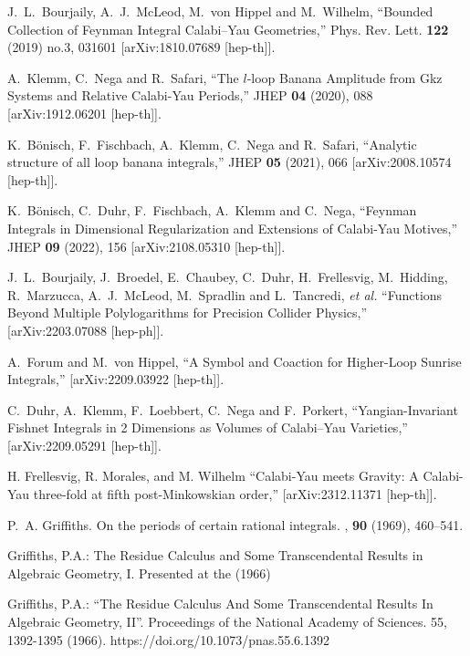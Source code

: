 \documentclass[a4paper,12pt]{article}
\numberwithin{equation}{section}
\numberwithin{figure}{section}
\begin{document}
\begin{thebibliography}{99}
J.~L.~Bourjaily, A.~J.~McLeod, M.~von Hippel and M.~Wilhelm,
``Bounded Collection of Feynman Integral Calabi--Yau Geometries,''
Phys. Rev. Lett. \textbf{122} (2019) no.3, 031601
[arXiv:1810.07689 [hep-th]].

A.~Klemm, C.~Nega and R.~Safari,
``The $l$-loop Banana Amplitude from Gkz Systems and Relative Calabi-Yau Periods,''
JHEP \textbf{04} (2020), 088
[arXiv:1912.06201 [hep-th]].

K.~B\"onisch, F.~Fischbach, A.~Klemm, C.~Nega and R.~Safari,
``Analytic structure of all loop banana integrals,''
JHEP \textbf{05} (2021), 066
[arXiv:2008.10574 [hep-th]].


K.~B\"onisch, C.~Duhr, F.~Fischbach, A.~Klemm and C.~Nega,
``Feynman Integrals in Dimensional Regularization and Extensions of Calabi-Yau Motives,''
JHEP \textbf{09} (2022), 156
[arXiv:2108.05310 [hep-th]].

J.~L.~Bourjaily, J.~Broedel, E.~Chaubey, C.~Duhr, H.~Frellesvig, M.~Hidding, R.~Marzucca, A.~J.~McLeod, M.~Spradlin and L.~Tancredi, \textit{et al.}
``Functions Beyond Multiple Polylogarithms for Precision Collider Physics,''
[arXiv:2203.07088 [hep-ph]].


A.~Forum and M.~von Hippel,
``A Symbol and Coaction for Higher-Loop Sunrise Integrals,''
[arXiv:2209.03922 [hep-th]].

C.~Duhr, A.~Klemm, F.~Loebbert, C.~Nega and F.~Porkert,
``Yangian-Invariant Fishnet Integrals in 2 Dimensions as Volumes of Calabi--Yau Varieties,''
[arXiv:2209.05291 [hep-th]].

H. Frellesvig, R. Morales, and M. Wilhelm
``Calabi-Yau meets Gravity: A Calabi-Yau three-fold at fifth post-Minkowskian order,''
[arXiv:2312.11371 [hep-th]].


P.~A. Griffiths.
\newblock On the periods of certain rational integrals.
, {\bf 90} (1969), 460--541.


   Griffiths, P.A.: The Residue Calculus and Some
    Transcendental Results in Algebraic Geometry, I. Presented at the
    (1966)

    Griffiths, P.A.: ``The Residue Calculus And Some Transcendental
    Results In Algebraic Geometry, II''. Proceedings of the National
    Academy of Sciences. 55, 1392-1395
    (1966). https://doi.org/10.1073/pnas.55.6.1392 


\end{thebibliography}
\end{document}
